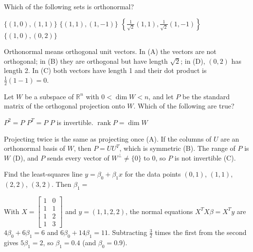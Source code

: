 \begin{question}[id=orth-13]
Which of the following sets is orthonormal?
\begin{options}
  \option $\{(1, 0), (1, 1)\}$
  \option $\{(1, 1), (1, -1)\}$
  \correct $\left\{\tfrac{1}{\sqrt{2}}(1, 1), \tfrac{1}{\sqrt{2}}(1, -1)\right\}$
  \option $\{(1, 0), (0, 2)\}$
\end{options}
\begin{solution}
Orthonormal means orthogonal unit vectors. In (A) the vectors are not orthogonal; in (B) they are orthogonal but have length $\sqrt{2}$; in (D), $(0, 2)$ has length 2. In (C) both vectors have length 1 and their dot product is $\frac{1}{2}(1 - 1) = 0$.
\end{solution}
\end{question}

\begin{question}[id=orth-14, type=msq, marks=2]
Let $W$ be a subspace of $\mathbb{R}^n$ with $0 < \dim W < n$, and let $P$ be the standard matrix of the orthogonal projection onto $W$. Which of the following are true?
\begin{options}
  \correct $P^2 = P$
  \correct $P^T = P$
  \option $P$ is invertible.
  \correct $\operatorname{rank} P = \dim W$
\end{options}
\begin{solution}
Projecting twice is the same as projecting once (A). If the columns of $U$ are an orthonormal basis of $W$, then $P = UU^T$, which is symmetric (B). The range of $P$ is $W$ (D), and $P$ sends every vector of $W^\perp \ne \{0\}$ to 0, so $P$ is not invertible (C).
\end{solution}
\end{question}

\begin{question}[id=orth-15, marks=2]
Find the least-squares line $y = \beta_0 + \beta_1 x$ for the data points $(0, 1)$, $(1, 1)$, $(2, 2)$, $(3, 2)$. Then $\beta_1 =$
\begin{solution}
With $X = \begin{bmatrix} 1 & 0 \\ 1 & 1 \\ 1 & 2 \\ 1 & 3 \end{bmatrix}$ and $y = (1, 1, 2, 2)$, the normal equations $X^TX\beta = X^Ty$ are $4\beta_0 + 6\beta_1 = 6$ and $6\beta_0 + 14\beta_1 = 11$. Subtracting $\tfrac{3}{2}$ times the first from the second gives $5\beta_1 = 2$, so $\beta_1 = 0.4$ (and $\beta_0 = 0.9$).
\end{solution}
\end{question}


